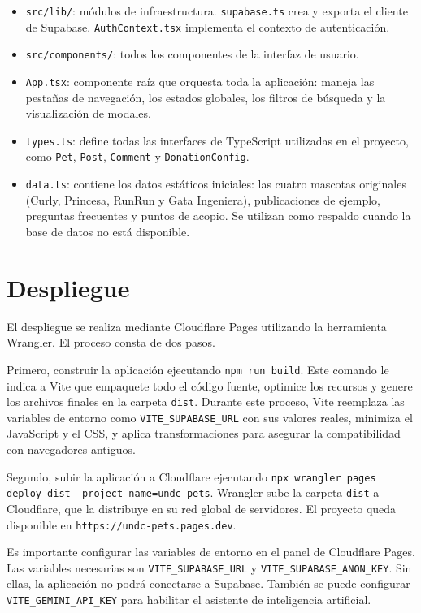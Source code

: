 \documentclass[12pt,a4paper]{article}
\begin{document}
\begin{itemize}
    \item \texttt{src/lib/}: módulos de infraestructura. \texttt{supabase.ts} crea y exporta el cliente de Supabase. \texttt{AuthContext.tsx} implementa el contexto de autenticación.
    \item \texttt{src/components/}: todos los componentes de la interfaz de usuario.
    \item \texttt{App.tsx}: componente raíz que orquesta toda la aplicación: maneja las pestañas de navegación, los estados globales, los filtros de búsqueda y la visualización de modales.
    \item \texttt{types.ts}: define todas las interfaces de TypeScript utilizadas en el proyecto, como \texttt{Pet}, \texttt{Post}, \texttt{Comment} y \texttt{DonationConfig}.
    \item \texttt{data.ts}: contiene los datos estáticos iniciales: las cuatro mascotas originales (Curly, Princesa, RunRun y Gata Ingeniera), publicaciones de ejemplo, preguntas frecuentes y puntos de acopio. Se utilizan como respaldo cuando la base de datos no está disponible.
\end{itemize}

\section{Despliegue}

El despliegue se realiza mediante Cloudflare Pages utilizando la herramienta Wrangler. El proceso consta de dos pasos.

Primero, construir la aplicación ejecutando \texttt{npm run build}. Este comando le indica a Vite que empaquete todo el código fuente, optimice los recursos y genere los archivos finales en la carpeta \texttt{dist}. Durante este proceso, Vite reemplaza las variables de entorno como \texttt{VITE\_SUPABASE\_URL} con sus valores reales, minimiza el JavaScript y el CSS, y aplica transformaciones para asegurar la compatibilidad con navegadores antiguos.

Segundo, subir la aplicación a Cloudflare ejecutando \texttt{npx wrangler pages deploy dist --project-name=undc-pets}. Wrangler sube la carpeta \texttt{dist} a Cloudflare, que la distribuye en su red global de servidores. El proyecto queda disponible en \texttt{https://undc-pets.pages.dev}.

Es importante configurar las variables de entorno en el panel de Cloudflare Pages. Las variables necesarias son \texttt{VITE\_SUPABASE\_URL} y \texttt{VITE\_SUPABASE\_ANON\_KEY}. Sin ellas, la aplicación no podrá conectarse a Supabase. También se puede configurar \texttt{VITE\_GEMINI\_API\_KEY} para habilitar el asistente de inteligencia artificial.
\end{document}
